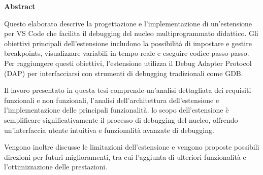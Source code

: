 \begin{center}
    \LARGE{\bf Abstract}
    \vspace{5mm}
\end{center}

Questo elaborato descrive la progettazione e l'implementazione di un'estensione per VS Code che facilita il debugging
del nucleo multiprogrammato didattico. Gli obiettivi principali dell'estensione includono la possibilità di
impostare e gestire breakpoints,
visualizzare variabili in tempo reale e eseguire codice passo-passo. Per raggiungere questi
obiettivi, l'estensione utilizza il Debug Adapter Protocol (DAP) per interfacciarsi con strumenti di debugging
tradizionali come GDB.

Il lavoro presentato in questa tesi comprende un'analisi dettagliata dei requisiti funzionali e non funzionali,
l'analisi dell'architettura dell'estensione e l'implementazione delle principali funzionalità.
lo scopo dell'estensione è semplificare significativamente il processo di debugging del nucleo,
offrendo un'interfaccia utente intuitiva e funzionalità avanzate di debugging.

Vengono inoltre discusse le limitazioni dell'estensione e vengono proposte possibili direzioni per futuri miglioramenti,
tra cui l'aggiunta di ulteriori funzionalità e l'ottimizzazione delle prestazioni.
